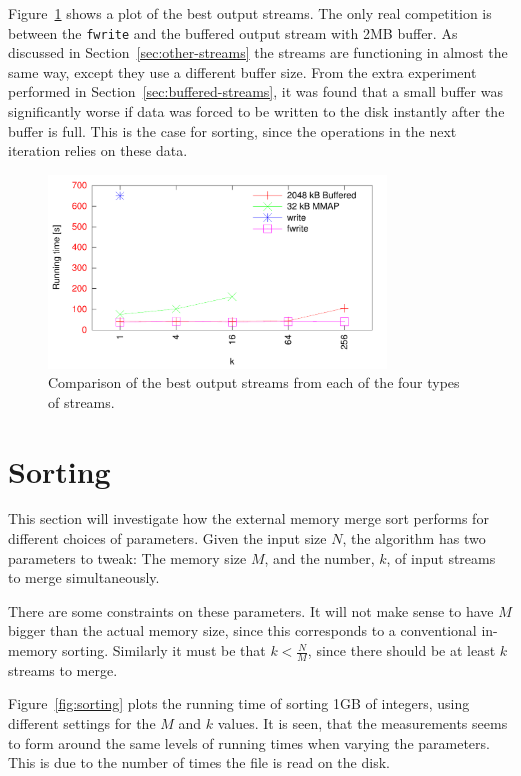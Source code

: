 \documentclass[a4paper,12pt]{article}
\begin{document}
Figure~\ref{fig:best-output} shows a plot of the best output
streams. The only real competition is between the \texttt{fwrite} and
the buffered output stream with 2MB buffer. As discussed in
Section~\ref{sec:other-streams} the streams are functioning in almost
the same way, except they use a different buffer size. From the extra
experiment performed in Section~\ref{sec:buffered-streams}, it was
found that a small buffer was significantly worse if data was forced
to be written to the disk instantly after the buffer is full. This is
the case for sorting, since the operations in the next iteration
relies on these data.

\begin{figure}[h!]
  \centering
  \includegraphics[width=0.8\textwidth]{best_output}
  \caption{Comparison of the best output streams from each of the four
    types of streams.}
  \label{fig:best-output}
\end{figure}

\section{Sorting}
This section will investigate how the external memory merge sort
performs for different choices of parameters. Given the input size
$N$, the algorithm has two parameters to tweak: The memory size $M$,
and the number, $k$, of input streams to merge simultaneously.

There are some constraints on these parameters. It will not make sense
to have $M$ bigger than the actual memory size, since this corresponds
to a conventional in-memory sorting. Similarly it must be that $k <
\frac{N}{M}$, since there should be at least $k$ streams to merge.

Figure~\ref{fig:sorting} plots the running time of sorting 1GB of
integers, using different settings for the $M$ and $k$ values. It is
seen, that the measurements seems to form around the same levels of
running times when varying the parameters. This is due to the number
of times the file is read on the disk.
\end{document}
